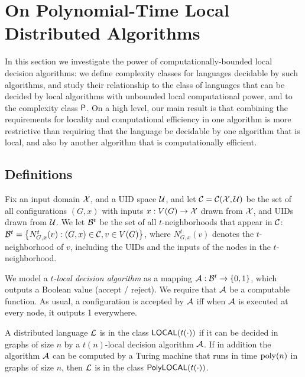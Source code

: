 \section{On Polynomial-Time Local Distributed Algorithms}
\label{sec:local}
In this section we investigate the power of computationally-bounded local decision algorithms:
we define complexity classes for languages decidable by 
such algorithms, and study their relationship to the class of languages
that can be decided by local algorithms with unbounded local computational power,
and to the complexity class ${\mathsf{P}}$.
On a high level, our main result is that combining the requirements for locality and computational efficiency
in one algorithm is more restrictive than requiring that the language
be decidable by one algorithm that is local,
and also by another algorithm that is computationally efficient.

\subsection{Definitions}
\label{sec:local_def}

Fix an input domain $\mathcal{X}$, and a UID space $\mathcal{U}$,
and let $\mathcal{C} = \mathcal{C}(\mathcal{X}, \mathcal{U})$ be the set of all configurations
$(G, x)$
with inputs $x : V(G) \rightarrow \mathcal{X}$ drawn from $\mathcal{X}$,
and UIDs drawn from $\mathcal{U}$.
We let $\mathcal{B}^t$ be the set of all $t$-neighborhoods that appear in $\mathcal{C}$:
	$\mathcal{B}^t = \left \{{ N_{G,x}^t(v) : (G,x) \in \mathcal{C}, v \in V(G) } \right \}$,
where $N_{G,x}^t(v)$ denotes the $t$-neighborhood of $v$,
including the UIDs and the inputs of the nodes in the $t$-neighborhood.

We model a \emph{$t$-local decision algorithm} as a mapping ${\mathcal{A}} : \mathcal{B}^t \rightarrow \left \{{0,1} \right \}$,
which outputs a Boolean value (accept / reject).
We require that ${\mathcal{A}}$ be a computable function.
As usual, a configuration is accepted by ${\mathcal{A}}$ iff when ${\mathcal{A}}$ is executed at every node,
it outputs 1 everywhere.

\begin{definition}
	A distributed language $\mathcal{L}$ is in the class ${\mathsf{LOCAL}}(t(\cdot))$ 
	if it can be decided in graphs of size $n$ by a $t(n)$-local decision algorithm ${\mathcal{A}}$.
	If in addition the algorithm ${\mathcal{A}}$ can be computed by a Turing machine
	that runs in time $\operatorname{poly}(n)$ in graphs of size $n$,
	then $\mathcal{L}$ is in the class ${\mathsf{PolyLOCAL}}(t(\cdot))$.
\end{definition}


